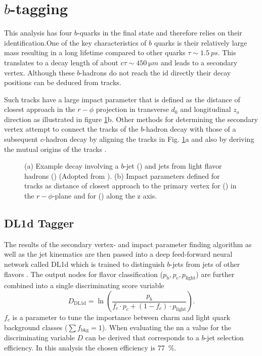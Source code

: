 \section{$b$-tagging}\label{sec:b_tagging}
This analysis has four $b$-quarks in the final state and therefore relies on their identification.One of the key characteristics of $b$ quarks is their relatively large mass resulting in a long lifetime compared to other quarks $\tau\sim\qty{1.5}{ps}$. This translates to a decay length of about $c\tau \sim \qty{450}{\micro m}$ and leads to a secondary vertex. Although these $b$-hadrons do not reach the \ac{id} directly their decay positions can be deduced from tracks.

Such tracks have a large impact parameter that is defined as the distance of closest approach in the $r-\phi$ projection in transverse $d_0$ and longitudinal $z_o$ direction \citep{aad2008atlas} as illustrated in figure \ref{fig:secondary_vertex}b. Other methods for determining the secondary vertex attempt to connect the tracks of the $b$-hadron decay with those of a subsequent $c$-hadron decay by aligning the tracks in Fig. \ref{fig:secondary_vertex}a and also by deriving the mutual origins of the tracks \citep{ATL-PHYS-PUB-2017-013}.
\begin{figure}[]
  \centering
  \caption{(a) Example decay involving a $b$-jet () and jets from light flavor hadrons () (Adopted from \cite{Guth:2765038}). (b) Impact parameters defined for tracks as distance of closest approach to the primary vertex for (\mbox{\color[HTML]{009245}{$d_0$}}) in the $r-\phi$-plane and for (\mbox{\color[HTML]{EC1C25}{$z_0$}}) along the z axis.}
  \label{fig:secondary_vertex}
\end{figure}

\subsection{DL1d Tagger}
The results of the secondary vertex- and impact parameter finding algorithm as well as the jet kinematics are then passed into a deep feed-forward neural network called DL1d which is trained to distinguish $b$-jets from jets of other flavors \citep{atlas2022atlas}. The output nodes for flavor classification ($p_\mathrm{b}, p_\mathrm{c}, p_\mathrm{light}$) are further combined into a single discriminating score variable
\begin{equation}
  D_\mathrm{DL1d}=\ln\left(\frac{p_b}{f_c \cdot p_c + (1-f_c)\cdot p_\mathrm{light} }\right).
\end{equation}
$f_c$ is a parameter to tune the importance between charm and light quark background classes ($\sum f_\mathrm{bkg} =1$). When evaluating the \ac{nn} a value for the discriminating variable $D$ can be derived that corresponds to a $b$-jet selection efficiency. In this analysis the chosen efficiency is \qty[]{77}{\percent}. 

